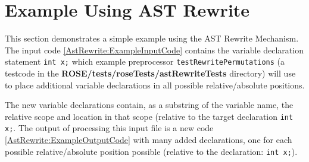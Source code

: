 \section{Example Using AST Rewrite}

    This section demonstrates a simple example using the AST Rewrite Mechanism.
The input code \ref{AstRewrite:ExampleInputCode} contains the variable declaration statement {\tt int x;}
which example preprocessor {\tt testRewritePermutations} (a testcode in the 
{\bf ROSE/tests/roseTests/astRewriteTests} directory) will use to place additional variable
declarations in all possible relative/absolute positions.

{\indent
{\mySmallFontSize

\label{AstRewrite:ExampleInputCode}

\begin{latexonly}
   
\end{latexonly}

\begin{htmlonly}
   
\end{htmlonly}

}
}

The new variable declarations contain, as a substring of the variable name,
the relative scope and location in that scope (relative to the target 
declaration {\tt int x;}.  The output of processing this input file is a new 
code \ref{AstRewrite:ExampleOutputCode} with many added
declarations, one for each possible relative/absolute position possible
(relative to the declaration: {\tt int x;}).

{\indent
{\mySmallFontSize

\label{AstRewrite:ExampleOutputCode}

\begin{latexonly}
   
\end{latexonly}

\begin{htmlonly}
   
\end{htmlonly}

}
}

